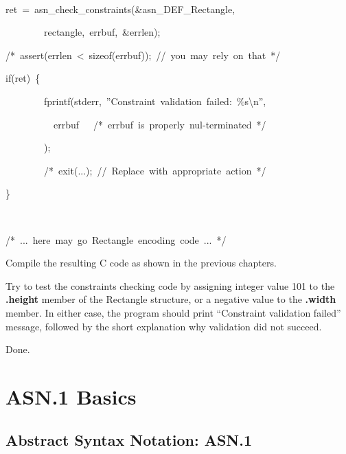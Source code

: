 \documentclass[english,oneside,12pt]{book}
\newenvironment{lyxcode}
{\par\begin{list}{}{
\setlength{\rightmargin}{\leftmargin}
\setlength{\listparindent}{0pt}%
\raggedright
\setlength{\itemsep}{0pt}
\setlength{\parsep}{0pt}
\normalfont\ttfamily}%
 \item[]}
{\end{list}}
\begin{document}
\begin{enumerate}
\begin{lyxcode}
{\small{}~}{\small \par}

{\small ret~=~asn\_check\_constraints(\&asn\_DEF\_Rectangle,}{\small \par}

{\small{}~~~~~~~~rectangle,~errbuf,~\&errlen);}{\small \par}

{\small /{*}~assert(errlen~<~sizeof(errbuf));~//~you~may~rely~on~that~{*}/}{\small \par}

{\small if(ret)~\{}{\small \par}

{\small{}~~~~~~~~fprintf(stderr,~''Constraint~validation~failed:~\%s\textbackslash{}n'',}{\small \par}

{\small{}~~~~~~~~~~errbuf~~~/{*}~errbuf~is~properly~nul-terminated~{*}/}{\small \par}

{\small{}~~~~~~~~);}{\small \par}

{\small{}~~~~~~~~/{*}~exit(...);~//~Replace~with~appropriate~action~{*}/}{\small \par}

{\small \}}{\small \par}

{\small{}~}{\small \par}

{\small /{*}~...~here~may~go~Rectangle~encoding~code~...~{*}/}{\small \par}
\end{lyxcode}
\item Compile the resulting C code as shown in the previous chapters.
\item Try to test the constraints checking code by assigning integer value
101 to the \textbf{.height} member of the Rectangle structure, or
a negative value to the \textbf{.width} member. In either case, the
program should print ``Constraint validation failed'' message, followed
by the short explanation why validation did not succeed.
\item Done.
\end{enumerate}

\part{\label{par:ASN.1-Basics}ASN.1 Basics}


\chapter{\label{cha:Abstract-Syntax-Notation:}Abstract Syntax Notation: ASN.1}
\end{document}
